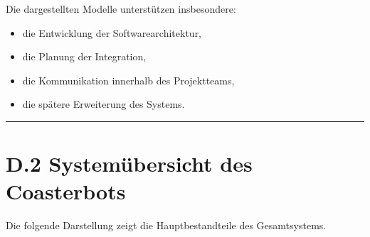 \documentclass[
  a4paper,
  12pt,
  DIV=12,        %
  parskip=half,  %
  headings=small %
]{scrartcl}
\theoremstyle{definition}
\providecommand{\tightlist}{%
  \setlength{\itemsep}{0pt}\setlength{\parskip}{0pt}}
\theoremstyle{definition}
\providecommand{\tightlist}{%
  \setlength{\itemsep}{0pt}\setlength{\parskip}{0pt}}
\begin{document}
Die dargestellten Modelle unterstützen insbesondere:

\begin{itemize}
\tightlist
\item
  die Entwicklung der Softwarearchitektur,
\item
  die Planung der Integration,
\item
  die Kommunikation innerhalb des Projektteams,
\item
  die spätere Erweiterung des Systems.
\end{itemize}

\begin{center}\rule{0.5\linewidth}{0.5pt}\end{center}

\section{D.2 Systemübersicht des
Coasterbots}\label{d.2-systemuxfcbersicht-des-coasterbots}

Die folgende Darstellung zeigt die Hauptbestandteile des Gesamtsystems.
\end{document}
